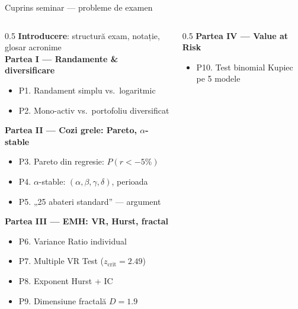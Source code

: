 \documentclass[9pt, aspectratio=169, t]{beamer}
\subtitle{Seminar: Probleme de examen --- exemple rezolvate}
\begin{document}
{
\begin{frame}
    \titlepage
\end{frame}
}

\begin{frame}[shrink=25]{Cuprins seminar --- probleme de examen}
\begin{columns}[T]
\begin{column}{0.5\textwidth}
\footnotesize
\textbf{Introducere}: structură exam, notație, glosar acronime
\\[0.3em]
\textbf{Partea I --- Randamente \& diversificare}
\begin{itemize}\setlength{\itemsep}{0pt}
    \item P1. Randament simplu vs.\ logaritmic
    \item P2. Mono-activ vs.\ portofoliu diversificat
\end{itemize}
\textbf{Partea II --- Cozi grele: Pareto, $\alpha$-stable}
\begin{itemize}\setlength{\itemsep}{0pt}
    \item P3. Pareto din regresie: $P(r<-5\%)$
    \item P4. $\alpha$-stable: $(\alpha,\beta,\gamma,\delta)$, perioada
    \item P5. „25 abateri standard'' --- argument
\end{itemize}
\textbf{Partea III --- EMH: VR, Hurst, fractal}
\begin{itemize}\setlength{\itemsep}{0pt}
    \item P6. Variance Ratio individual
    \item P7. Multiple VR Test ($z_{\text{crit}}=2.49$)
    \item P8. Exponent Hurst + IC
    \item P9. Dimensiune fractală $D=1.9$
\end{itemize}
\end{column}
\begin{column}{0.5\textwidth}
\footnotesize
\textbf{Partea IV --- Value at Risk}
\begin{itemize}\setlength{\itemsep}{0pt}
    \item P10. Test binomial Kupiec pe 5 modele

\end{itemize}
\end{column}
\end{columns}
\end{frame}
\end{document}
